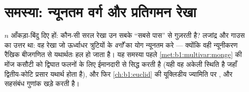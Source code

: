 \section{समस्या: न्यूनतम वर्ग और प्रतिगमन रेखा}

\begin{problem}\label{pb:b1:multivar:1}
$n$ आँकड़ा-बिंदु दिए हों: कौन-सी सरल रेखा उन सबके ``सबसे पास'' से गुज़रती
है? लजांद्र और गाउस का उत्तर था: वह रेखा जो ऊर्ध्वाधर त्रुटियों के
\emph{वर्गों} का योग न्यूनतम करे --- क्योंकि वही न्यूनीकरण रैखिक बीजगणित से
यथार्थतः हल हो जाता है। यह समस्या पहले \cref{met:b1:multivar:monge} की मोंज
कसौटी को द्विघात फलनों के लिए ईमानदारी से सिद्ध करती है (यही वह अकेली
स्थिति है जहाँ द्वितीय-कोटि प्रसार यथार्थ होता है), और फिर
\cref{ch:b1:euclid} की यूक्लिडीय ज्यामिति पर ,  और सहसंबंध गुणांक खड़े करती
है।


\end{problem}
